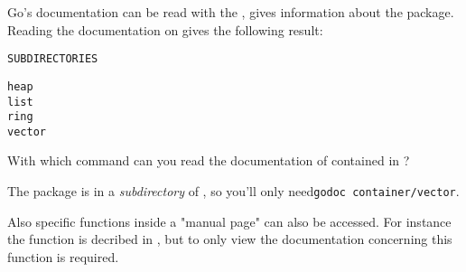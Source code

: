 \begin{Exercise}[title={Documentation},difficulty=1]
\label{ex:doc}
\Question
Go's documentation can be read with the , 
gives information about the  package. Reading the
documentation on  gives the following result:
\begin{alltt}
SUBDIRECTORIES

heap
list
ring
vector
\end{alltt}

With which  command can you read the documentation of  contained in
?

\end{Exercise}

\begin{Answer}
\Question
The package  is in a \emph{subdirectory} of
, so you'll only need\quad \texttt{godoc
container/vector}.

Also specific functions inside a "manual page" can also be accessed. For
instance the function  is decribed in , but to
only view the documentation concerning this function  is required.
\end{Answer}
